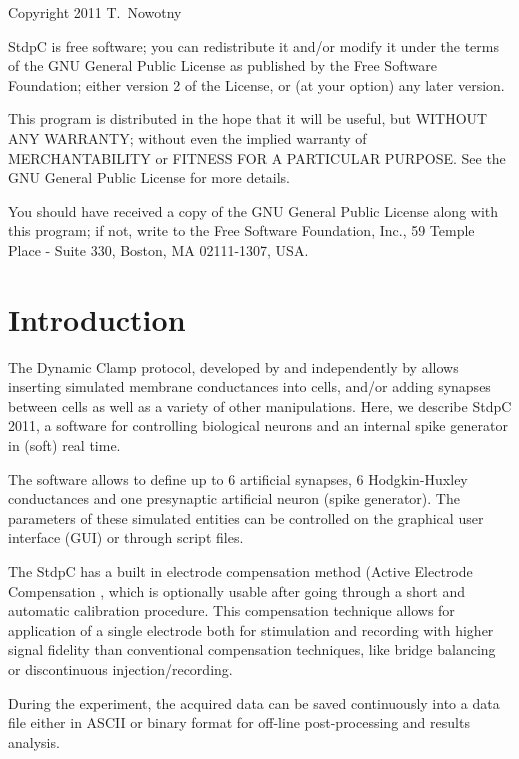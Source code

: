 \documentclass{article}
\begin{document}
Copyright 2011 T.~Nowotny

StdpC is free software; you can redistribute it and/or modify  
it under the terms of the GNU General Public License as published by 
the Free Software Foundation; either version 2 of the License, or 
(at your option) any later version.                               

This program is distributed in the hope that it will be useful,
but WITHOUT ANY WARRANTY; without even the implied warranty of
MERCHANTABILITY or FITNESS FOR A PARTICULAR PURPOSE.  See the 
GNU General Public License for more details.

You should have received a copy of the GNU General Public License
along with this program; if not, write to the
Free Software Foundation, Inc., 59 Temple Place - Suite 330, Boston,
MA  02111-1307, USA.

\newpage
\section{Introduction}
           
The Dynamic Clamp protocol, developed by \cite{Sharp1993} and
independently by \cite{Robinson1993} allows inserting simulated
membrane conductances into cells, and/or adding synapses between cells
as well as a variety of other manipulations. Here, we describe StdpC
2011, a software for controlling biological neurons and an internal
spike generator in (soft) real time.

The software allows to define up to $6$ artificial synapses, $6$
Hodgkin-Huxley conductances \cite{Hodgkin1949} and one presynaptic
artificial neuron (spike generator). The parameters of these simulated
entities can be controlled on the graphical user interface (GUI) or
through script files.  

The StdpC has a built in electrode compensation method (Active
Electrode Compensation \cite{Brette2008}, which is optionally usable after
going through a short and automatic calibration procedure. This
compensation technique allows for application of a single electrode both
for stimulation and recording with higher signal fidelity than conventional
compensation techniques, like bridge balancing or discontinuous
injection/recording. 

During the experiment, the acquired data can be saved continuously into a
data file either in ASCII or binary format for off-line post-processing and
results analysis.
 
\end{document}
